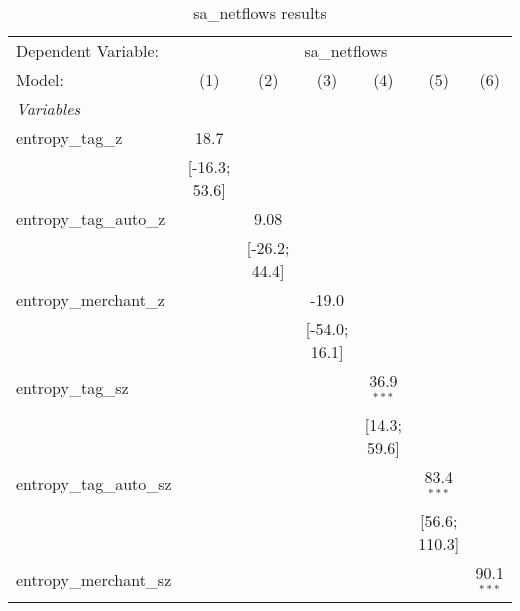 
\begin{table}[htbp]
   \centering
   \tiny
   \begin{threeparttable}[b]
      \caption{\label{tab:reg_sa_netflows_full.tex} sa\_netflows results}
      \begin{tabular}{lcccccc}
         \tabularnewline \midrule \midrule
         Dependent Variable: & \multicolumn{6}{c}{sa\_netflows}\\
         Model:                    & (1)              & (2)              & (3)              & (4)              & (5)              & (6)\\  
         \midrule
         \emph{Variables}\\
         entropy\_tag\_z           & 18.7             &                  &                  &                  &                  &   \\   
                                   & [-16.3; 53.6]    &                  &                  &                  &                  &   \\   
         entropy\_tag\_auto\_z     &                  & 9.08             &                  &                  &                  &   \\   
                                   &                  & [-26.2; 44.4]    &                  &                  &                  &   \\   
         entropy\_merchant\_z      &                  &                  & -19.0            &                  &                  &   \\   
                                   &                  &                  & [-54.0; 16.1]    &                  &                  &   \\   
         entropy\_tag\_sz          &                  &                  &                  & 36.9$^{***}$     &                  &   \\   
                                   &                  &                  &                  & [14.3; 59.6]     &                  &   \\   
         entropy\_tag\_auto\_sz    &                  &                  &                  &                  & 83.4$^{***}$     &   \\   
                                   &                  &                  &                  &                  & [56.6; 110.3]    &   \\   
         entropy\_merchant\_sz     &                  &                  &                  &                  &                  & 90.1$^{***}$\\   

\end{tabular}
\end{threeparttable}
\end{table}
